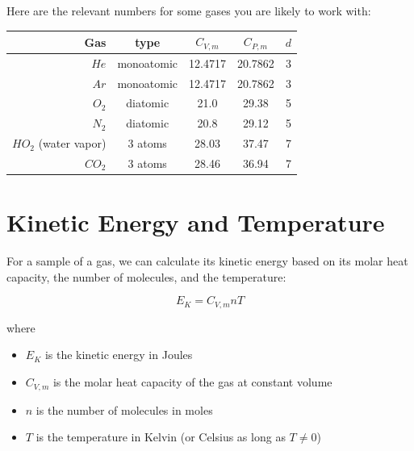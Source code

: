 Here are the relevant numbers for some gases you are likely to work with:

\begin{tabular}{r|c|c| c| c}
Gas & type & $C_{V,m}$ & $C_{P,m}$ & $d$\\
\hline
$He$ & monoatomic & 12.4717 & 20.7862 & 3 \\
$Ar$ & monoatomic & 12.4717 & 20.7862 & 3 \\
$O_2$ & diatomic & 21.0 & 29.38 & 5\\
$N_2$ & diatomic & 20.8 & 29.12 & 5\\
$HO_2$ (water vapor) & 3 atoms & 28.03 & 37.47 & 7 \\
$CO_2$ & 3 atoms & 28.46 & 36.94 & 7\\
\end{tabular}

\section{Kinetic Energy and Temperature}

For a sample of a gas, we can calculate its kinetic energy based on its molar heat capacity, the number of molecules, and the temperature:

$$E_K = C_{V,m} n T$$

where

\begin{itemize}
\item $E_K$ is the kinetic energy in Joules
\item $C_{V,m}$ is the molar heat capacity of the gas at constant volume
\item $n$ is the number of molecules in moles
\item $T$ is the temperature in Kelvin (or Celsius as long as $T\ne 0$)
\end{itemize}


